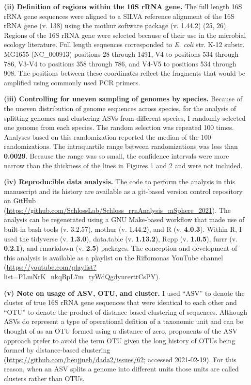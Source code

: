 \documentclass[
]{article}
\begin{document}
\textbf{(ii) Definition of regions within the 16S rRNA gene.} The full
length 16S rRNA gene sequences were aligned to a SILVA reference
alignment of the 16S rRNA gene (v. 138) using the mothur software
package (v. 1.44.2) (25, 26). Regions of the 16S rRNA gene were selected
because of their use in the microbial ecology literature. Full length
sequences corresponded to \emph{E. coli} str. K-12 substr. MG1655
(NC\_000913) positions 28 through 1491, V4 to positions 534 through 786,
V3-V4 to positions 358 through 786, and V4-V5 to positions 534 through
908. The positions between these coordinates reflect the fragments that
would be amplified using commonly used PCR primers.

\textbf{(iii) Controlling for uneven sampling of genomes by species.}
Because of the uneven distribution of genome sequences across species,
for the analysis of splitting genomes and clustering ASVs from different
species, I randomly selected one genome from each species. The random
selection was repeated 100 times. Analyses based on this randomization
reported the median of the 100 randomizations. The intraquartile range
between randomizations was less than \textbf{0.0029}. Because the range
was so small, the confidence intervals were more narrow than the
thickness of the lines in Figures 1 and 2 and were not included.

\textbf{(iv) Reproducible data analysis.} The code to perform the
analysis in this manuscript and its history are available as a git-based
version control repository on GitHub
(\url{https://github.com/SchlossLab/Schloss_rrnAnalysis_mSphere_2021}).
The analysis can be regenerated using a GNU Make-based workflow that
made use of built-in bash tools (v. 3.2.57), mothur (v. 1.44.2), and R
(v. \textbf{4.0.3}). Within R, I used the tidyverse (v. \textbf{1.3.0}),
data.table (v. \textbf{1.13.2}), Rcpp (v. \textbf{1.0.5}), furrr (v.
\textbf{0.2.1}), and rmarkdown (v. \textbf{2.5}) packages. The
conception and development of this analysis is available as a playlist
on the Riffomonas YouTube channel
(\url{https://youtube.com/playlist?list=PLmNrK_nkqBpL7m_tyWdQgdyurerttCsPY}).

\textbf{(v) Note on usage of ASV, OTU, and cluster.} I used ``ASV'' to
denote the cluster of true 16S rRNA gene sequences that were identical
to each other and ``OTU'' to denote the product of distance-based
clustering of sequences. Although ASVs do represent a type of
operational defition of a taxonomic unit and can be thought of as an OTU
formed using a distance of zero, proponents of the ASV approach prefer
to avoid the term OTU given the long history of OTUs being formed by
distance-based clustering
(\url{https://github.com/benjjneb/dada2/issues/62}; accessed
2021-02-19). For this reason, when an ASV splits a genome into different
units those units are called clusters rather than OTUs.
\end{document}
